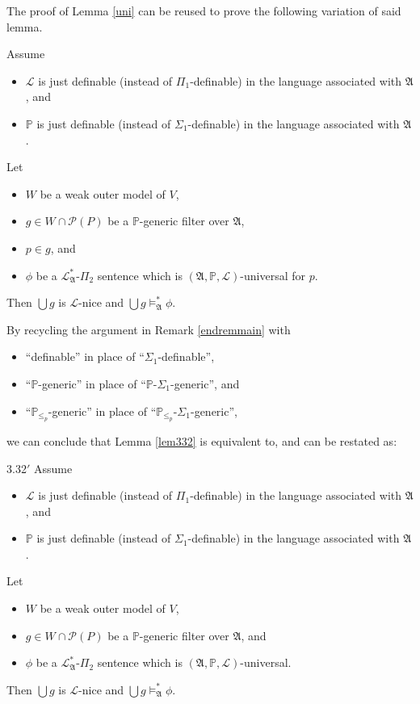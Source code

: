 \documentclass[12pt]{article}
\numberwithin{equation}{section}
\begin{document}
\begin{rem}
The proof of Lemma \ref{uni} can be reused to prove the following variation of said lemma.
\begin{lem}\label{lem332}
Assume 
\begin{itemize}
    \item $\mathcal{L}$ is just definable (instead of $\Pi_1$-definable) in the language associated with $\mathfrak{A}$, and
    \item $\mathbb{P}$ is just definable (instead of $\Sigma_1$-definable) in the language associated with $\mathfrak{A}$.
\end{itemize}
Let 
\begin{itemize} 
    \item $W$ be a weak outer model of $V$,
    \item $g \in W \cap \mathcal{P}(P)$ be a $\mathbb{P}$-generic filter over $\mathfrak{A}$, 
    \item $p \in g$, and
    \item $\phi$ be a $\mathcal{L}^{*}_{\mathfrak{A}}$-$\Pi_2$ sentence which is $(\mathfrak{A}, \mathbb{P}, \mathcal{L})$-universal for $p$.
\end{itemize} 
Then $\bigcup g$ is $\mathcal{L}$-nice and $\bigcup g \models^{*}_{\mathfrak{A}} \phi$.
\end{lem}

By recycling the argument in Remark \ref{endremmain} with 
\begin{itemize}
    \item ``definable'' in place of ``$\Sigma_1$-definable'', 
    \item ``$\mathbb{P}$-generic'' in place of ``$\mathbb{P}$-$\Sigma_1$-generic'', and
    \item ``$\mathbb{P}_{\leq_p}$-generic'' in place of ``$\mathbb{P}_{\leq_p}$-$\Sigma_1$-generic'',
\end{itemize}
we can conclude that Lemma \ref{lem332} is equivalent to, and can be restated as:

\begin{customlem}{3.32$'$}
Assume 
\begin{itemize}
    \item $\mathcal{L}$ is just definable (instead of $\Pi_1$-definable) in the language associated with $\mathfrak{A}$, and
    \item $\mathbb{P}$ is just definable (instead of $\Sigma_1$-definable) in the language associated with $\mathfrak{A}$.
\end{itemize}
Let 
\begin{itemize} 
    \item $W$ be a weak outer model of $V$,
    \item $g \in W \cap \mathcal{P}(P)$ be a $\mathbb{P}$-generic filter over $\mathfrak{A}$, and
    \item $\phi$ be a $\mathcal{L}^{*}_{\mathfrak{A}}$-$\Pi_2$ sentence which is $(\mathfrak{A}, \mathbb{P}, \mathcal{L})$-universal.
\end{itemize} 
Then $\bigcup g$ is $\mathcal{L}$-nice and $\bigcup g \models^{*}_{\mathfrak{A}} \phi$.
\end{customlem}
\end{rem}
\end{document}
